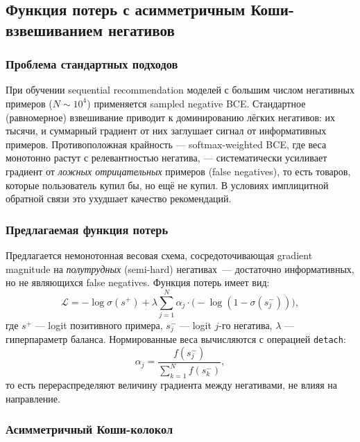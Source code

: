 \subsection{Функция потерь с асимметричным Коши-взвешиванием негативов}
\label{sec:ch2:loss}

\subsubsection{Проблема стандартных подходов}

При обучении sequential recommendation моделей с большим числом негативных примеров ($N \sim 10^4$)
применяется sampled negative BCE. Стандартное (равномерное) взвешивание приводит к доминированию
лёгких негативов: их тысячи, и суммарный градиент от них заглушает сигнал от информативных
примеров. Противоположная крайность --- softmax-weighted BCE, где веса монотонно растут с
релевантностью негатива, --- систематически усиливает градиент от \emph{ложных отрицательных}
примеров (false negatives), то есть товаров, которые пользователь купил бы, но ещё не купил.
В условиях имплицитной обратной связи это ухудшает качество рекомендаций.

\subsubsection{Предлагаемая функция потерь}

Предлагается немонотонная весовая схема, сосредоточивающая gradient magnitude на
\emph{полутрудных} (semi-hard) негативах~--- достаточно информативных, но не являющихся
false negatives. Функция потерь имеет вид:
\begin{equation}
  \mathcal{L}
  = -\log\sigma(s^+)
  + \lambda \sum_{j=1}^{N} \alpha_j \cdot \bigl(-\log(1 - \sigma(s_j^-))\bigr),
  \label{eq:cauchy_bce}
\end{equation}
где $s^+$ --- logit позитивного примера, $s_j^-$ --- logit $j$-го негатива, $\lambda$ ---
гиперпараметр баланса. Нормированные веса вычисляются с операцией \texttt{detach}:
\begin{equation}
  \alpha_j = \frac{f(s_j^-)}{\displaystyle\sum_{k=1}^{N} f(s_k^-)},
  \label{eq:alpha}
\end{equation}
то есть перераспределяют величину градиента между негативами, не влияя на направление.

\subsubsection{Асимметричный Коши-колокол}

